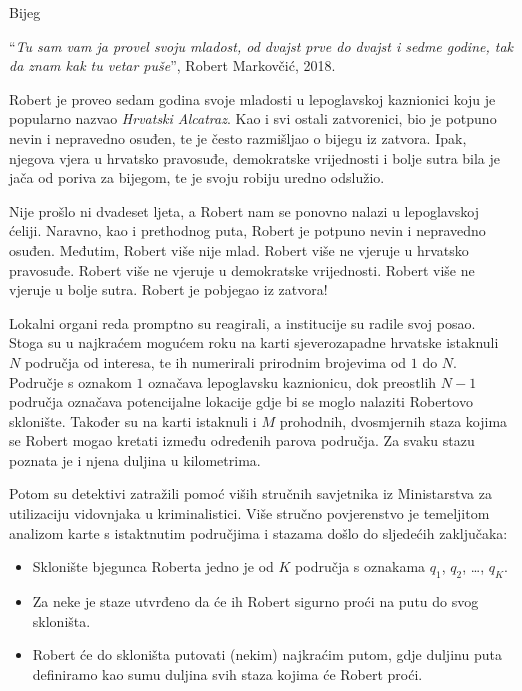 \begin{statement}[
  problempoints=100,
  timelimit=2 sekunde,
  memorylimit=512 MiB,
]{Bijeg}

``\textit{Tu sam vam ja provel svoju mladost, od dvajst prve do dvajst i sedme
godine, tak da znam kak tu vetar puše}'', Robert Markovčić, 2018.

Robert je proveo sedam godina svoje mladosti u lepoglavskoj kaznionici koju je
popularno nazvao \textit{Hrvatski Alcatraz}. Kao i svi ostali zatvorenici, bio
je potpuno nevin i nepravedno osuđen, te je često razmišljao o bijegu iz zatvora.
Ipak, njegova vjera u hrvatsko pravosuđe, demokratske vrijednosti i bolje sutra
bila je jača od poriva za bijegom, te je svoju robiju uredno odslužio.

Nije prošlo ni dvadeset ljeta, a Robert nam se ponovno nalazi u lepoglavskoj
ćeliji. Naravno, kao i prethodnog puta, Robert je potpuno nevin i nepravedno
osuđen. Međutim, Robert više nije mlad. Robert više ne vjeruje u hrvatsko
pravosuđe.  Robert više ne vjeruje u demokratske vrijednosti. Robert više ne
vjeruje u bolje sutra. Robert je pobjegao iz zatvora!

Lokalni organi reda promptno su reagirali, a institucije su radile svoj posao.
Stoga su u najkraćem mogućem roku na karti sjeverozapadne hrvatske istaknuli
$N$ područja od interesa, te ih numerirali prirodnim brojevima od $1$ do $N$.
Područje s oznakom $1$ označava lepoglavsku kaznionicu, dok preostlih $N-1$
područja označava potencijalne lokacije gdje bi se moglo nalaziti Robertovo
sklonište. Također su na karti istaknuli i $M$ prohodnih, dvosmjernih staza
kojima se Robert mogao kretati između određenih parova područja. Za svaku
stazu poznata je i njena duljina u kilometrima.

Potom su detektivi zatražili pomoć viših stručnih savjetnika iz Ministarstva za
utilizaciju vidovnjaka u kriminalistici. Više stručno povjerenstvo je temeljitom
analizom karte s istaktnutim područjima i stazama došlo do sljedećih zaključaka:

\begin{itemize}
  \item Sklonište bjegunca Roberta jedno je od $K$ područja s oznakama
        $q_1$, $q_2$, \ldots, $q_K$.
  \item Za neke je staze utvrđeno da će ih Robert sigurno proći na putu do svog
        skloništa.
  \item Robert će do skloništa putovati (nekim) najkraćim putom, gdje duljinu
        puta definiramo kao sumu duljina svih staza kojima će Robert proći.
\end{itemize}


\end{statement}

